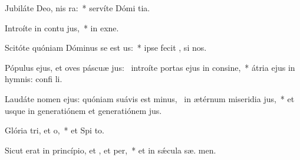 \item Jubiláte Deo, nis ra:~* servíte Dómi  tia.
\item Introíte in contu jus,~* in exne.
\item Scitóte quóniam Dóminus se est us:~* ipse fecit ,   si nos.
\item Pópulus ejus, et oves páscuæ jus:~\pscross{} introíte portas ejus in consine,~* átria ejus in hymnis: confi li.
\item Laudáte nomen ejus: quóniam suávis est minus,~\pscross{} in ætérnum miseridia jus,~* et usque in generatiónem et generatiónem  jus.
\item Glória tri, et o,~* et Spi to.
\item Sicut erat in princípio, et , et per,~* et in sǽcula sæ. men.
